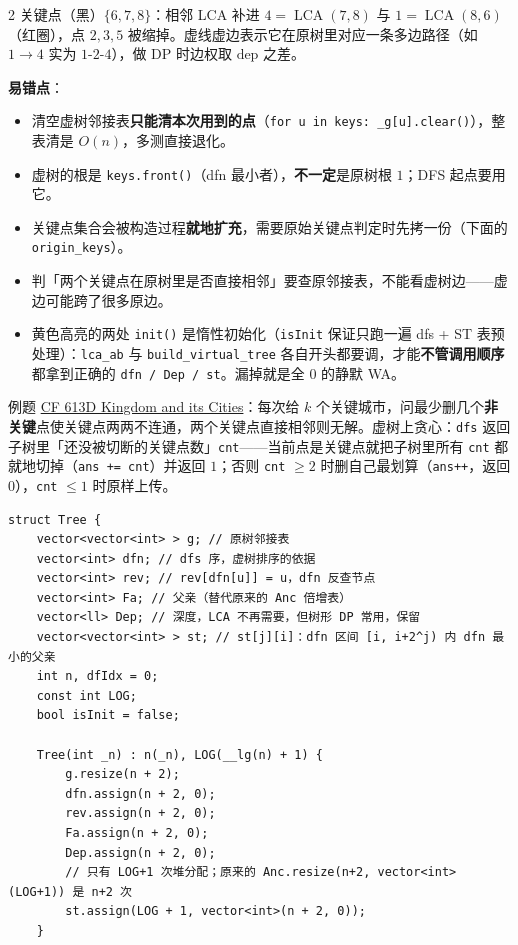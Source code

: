 \begin{multicols*}{2}
		关键点（黑）$\{6,7,8\}$：相邻 LCA 补进 $4 = \operatorname{LCA}(7,8)$ 与 $1 = \operatorname{LCA}(8,6)$（红圈），点 $2,3,5$ 被缩掉。虚线虚边表示它在原树里对应一条多边路径（如 $1 \to 4$ 实为 $1\text{-}2\text{-}4$），做 DP 时边权取 $\text{dep}$ 之差。

		\textbf{易错点}：

		\begin{itemize}
			\item 清空虚树邻接表\textbf{只能清本次用到的点}（\texttt{for u in keys: \_g[u].clear()}），整表清是 $O(n)$，多测直接退化。
			\item 虚树的根是 \texttt{keys.front()}（dfn 最小者），\textbf{不一定}是原树根 $1$；DFS 起点要用它。
			\item 关键点集合会被构造过程\textbf{就地扩充}，需要原始关键点判定时先拷一份（下面的 \texttt{origin\_keys}）。
			\item 判「两个关键点在原树里是否直接相邻」要查原邻接表，不能看虚树边——虚边可能跨了很多原边。
			\item \colorbox{yellow!45}{黄色高亮的两处 \texttt{init()}} 是惰性初始化（\texttt{isInit} 保证只跑一遍 dfs + ST 表预处理）：\texttt{lca\_ab} 与 \texttt{build\_virtual\_tree} 各自开头都要调，才能\textbf{不管调用顺序}都拿到正确的 \texttt{dfn / Dep / st}。漏掉就是全 $0$ 的静默 WA。
		\end{itemize}

		例题 \href{https://codeforces.com/contest/613/problem/D}{CF 613D Kingdom and its Cities}：每次给 $k$ 个关键城市，问最少删几个\textbf{非关键}点使关键点两两不连通，两个关键点直接相邻则无解。虚树上贪心：\texttt{dfs} 返回子树里「还没被切断的关键点数」\texttt{cnt}——当前点是关键点就把子树里所有 \texttt{cnt} 都就地切掉（\texttt{ans += cnt}）并返回 $1$；否则 \texttt{cnt} $\geq 2$ 时删自己最划算（\texttt{ans++}，返回 $0$），\texttt{cnt} $\leq 1$ 时原样上传。

		\begin{verbatim}
struct Tree {
    vector<vector<int> > g; // 原树邻接表
    vector<int> dfn; // dfs 序，虚树排序的依据
    vector<int> rev; // rev[dfn[u]] = u，dfn 反查节点
    vector<int> Fa; // 父亲（替代原来的 Anc 倍增表）
    vector<ll> Dep; // 深度，LCA 不再需要，但树形 DP 常用，保留
    vector<vector<int> > st; // st[j][i]：dfn 区间 [i, i+2^j) 内 dfn 最小的父亲
    int n, dfIdx = 0;
    const int LOG;
    bool isInit = false;

    Tree(int _n) : n(_n), LOG(__lg(n) + 1) {
        g.resize(n + 2);
        dfn.assign(n + 2, 0);
        rev.assign(n + 2, 0);
        Fa.assign(n + 2, 0);
        Dep.assign(n + 2, 0);
        // 只有 LOG+1 次堆分配；原来的 Anc.resize(n+2, vector<int>(LOG+1)) 是 n+2 次
        st.assign(LOG + 1, vector<int>(n + 2, 0));
    }


\end{verbatim}
\end{multicols*}

